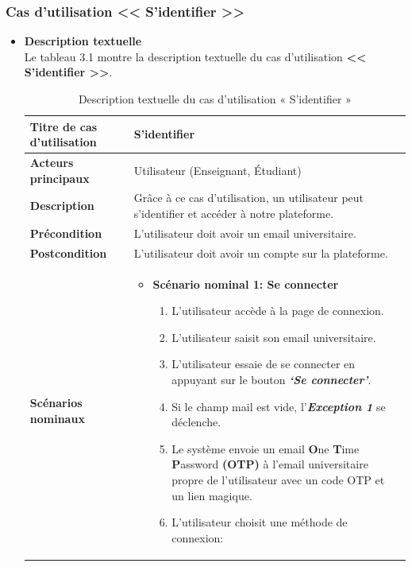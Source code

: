 \subsubsection{Cas d’utilisation << S’identifier >> }
\begin{itemize}[itemsep=1pt, parsep=1pt]
    \item \textbf{Description textuelle}\\
    Le tableau 3.1 montre la description textuelle du cas d’utilisation \textbf{<< S’identifier >>}.
\newpage
    \begin{longtable}{|>{\RaggedRight\arraybackslash}p{4cm}|>{\RaggedRight\arraybackslash}p{12cm}|}
        \caption{Description textuelle du cas d’utilisation « S’identifier »} \\
        \hline
        \textbf{Titre de cas d’utilisation} & \textbf{S’identifier} \\
        \hline
        \textbf{Acteurs principaux} & Utilisateur (Enseignant, Étudiant) \\
        \hline
        \textbf{Description} & Grâce à ce cas d’utilisation, un utilisateur peut s’identifier et accéder à notre plateforme. \\
        \hline
        \textbf{Précondition} & L’utilisateur doit avoir un email universitaire. \\
        \hline
        \textbf{Postcondition} & L’utilisateur doit avoir un compte sur la plateforme. \\
        \hline
        \textbf{Scénarios nominaux} & 
        \begin{itemize}[label=]
            \item \textbf{Scénario nominal 1: Se connecter}
            \begin{enumerate}
                \item L’utilisateur accède à la page de connexion.
                \item L’utilisateur saisit son email universitaire.
                \item L’utilisateur essaie de se connecter en appuyant sur le bouton \textbf{\textit{‘Se connecter’}}.
                \item Si le champ mail est vide, l’\textbf{\textit{Exception 1}} se déclenche.
                \item Le système envoie un email \textbf{O}ne \textbf{T}ime \textbf{P}assword \textbf{(OTP)} à l’email universitaire propre de l’utilisateur avec un code OTP et un lien magique.
                \item L’utilisateur choisit une méthode de connexion: 

\end{enumerate}
\end{itemize}
\end{longtable}
\end{itemize}

